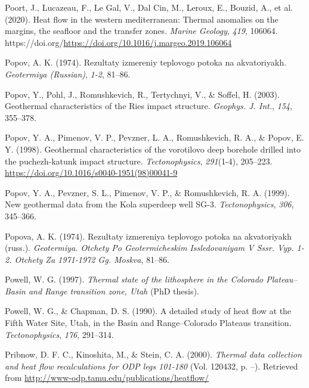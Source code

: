 \begin{CSLReferences}{1}{1}
\leavevmode{}%
Poort, J., Lucazeau, F., Le Gal, V., Dal Cin, M., Leroux, E., Bouzid, A., et al. (2020). Heat flow in the western mediterranean: Thermal anomalies on the margins, the seafloor and the transfer zones. \emph{Marine Geology}, \emph{419}, 106064. https://doi.org/\url{https://doi.org/10.1016/j.margeo.2019.106064}

\leavevmode{}%
Popov, A. K. (1974). Rezultaty izmereniy teplovogo potoka na akvatoriyakh. \emph{Geotermiya (Russian)}, \emph{1-2}, 81--86.

\leavevmode{}%
Popov, Y., Pohl, J., Romushkevich, R., Tertychnyi, V., \& Soffel, H. (2003). Geothermal characteristics of the {Ries} impact structure. \emph{Geophys. J. Int.}, \emph{154}, 355--378.

\leavevmode{}%
Popov, Y. A., Pimenov, V. P., Pevzner, L. A., Romushkevich, R. A., \& Popov, E. Y. (1998). Geothermal characteristics of the vorotilovo deep borehole drilled into the puchezh-katunk impact structure. \emph{Tectonophysics}, \emph{291}(1-4), 205--223. \url{https://doi.org/10.1016/s0040-1951(98)00041-9}

\leavevmode{}%
Popov, Y. A., Pevzner, S. L., Pimenov, V. P., \& Romushkevich, R. A. (1999). New geothermal data from the {Kola} superdeep well {SG-3}. \emph{Tectonophysics}, \emph{306}, 345--366.

\leavevmode{}%
Popova, A. K. (1974). Rezultaty izmereniya teplovogo potoka na akvatoriyakh (russ.). \emph{Geotermiya. Otchety Po Geotermicheskim Issledovaniyam V Sssr. Vyp. 1-2. Otchety Za 1971-1972 Gg. Moskva}, 81--86.

\leavevmode{}%
Powell, W. G. (1997). \emph{Thermal state of the lithosphere in the {Colorado Plateau--Basin and Range} transition zone, {Utah}} (PhD thesis).

\leavevmode{}%
Powell, W. G., \& Chapman, D. S. (1990). A detailed study of heat flow at the {Fifth Water Site, Utah}, in the {Basin and Range--Colorado Plateaus} transition. \emph{Tectonophysics}, \emph{176}, 291--314.

\leavevmode{}%
Pribnow, D. F. C., Kinoshita, M., \& Stein, C. A. (2000). \emph{Thermal data collection and heat flow recalculations for ODP legs 101-180} (Vol. 120432, p. --). Retrieved from \url{http://www-odp.tamu.edu/publications/heatflow/}


\end{CSLReferences}
